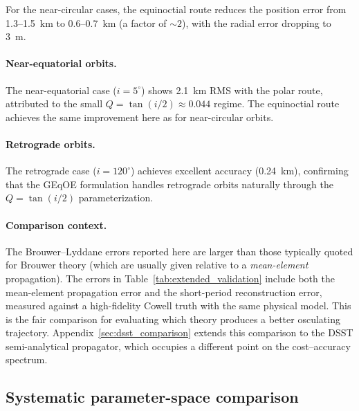 \documentclass[11pt]{article}
\begin{document}
For the near-circular cases, the equinoctial route reduces the position
error from 1.3--1.5~km to 0.6--0.7~km (a factor of $\sim\!2$), with
the radial error dropping to 3~m.

\paragraph{Near-equatorial orbits.}
The near-equatorial case ($i = 5^\circ$) shows 2.1~km RMS with the polar
route, attributed to the small $Q = \tan(i/2) \approx 0.044$ regime.
The equinoctial route achieves the same improvement here as for
near-circular orbits.

\paragraph{Retrograde orbits.}
The retrograde case ($i = 120^\circ$) achieves excellent accuracy (0.24~km),
confirming that the GEqOE formulation handles retrograde orbits naturally
through the $Q = \tan(i/2)$ parameterization.

\paragraph{Comparison context.}
The Brouwer--Lyddane errors reported here are larger than those typically
quoted for Brouwer theory (which are usually given relative to
a \emph{mean-element} propagation). The errors in
Table~\ref{tab:extended_validation} include both the mean-element propagation
error and the short-period reconstruction error, measured against a
high-fidelity Cowell truth with the same physical model. This is the
fair comparison for evaluating which theory produces a better osculating
trajectory. Appendix~\ref{sec:dsst_comparison} extends this comparison to
the DSST semi-analytical propagator, which occupies a different point on the
cost--accuracy spectrum.


\subsection{Systematic parameter-space comparison}
\label{sec:parameter_space}
\end{document}

